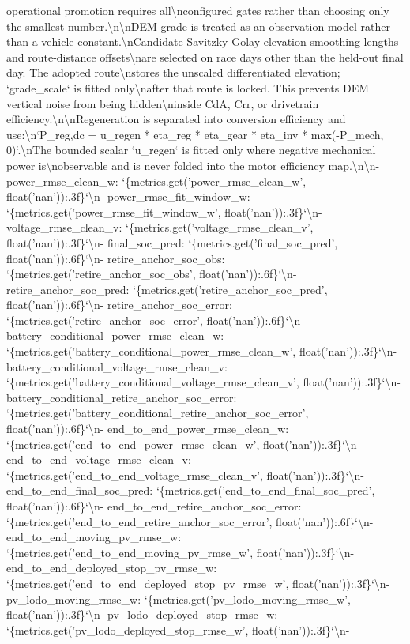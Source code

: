 \documentclass[a4paper,11pt]{article}
\begin{document}
\begin{enumerate}[leftmargin=1.8em]
operational promotion requires all\textbackslash{}nconfigured gates rather than choosing only the smallest number.\textbackslash{}n\textbackslash{}nDEM grade is treated as an observation model rather than a vehicle constant.\textbackslash{}nCandidate Savitzky-Golay elevation smoothing lengths and route-distance offsets\textbackslash{}nare selected on race days other than the held-out final day. The adopted route\textbackslash{}nstores the unscaled differentiated elevation; `grade\_scale` is fitted only\textbackslash{}nafter that route is locked. This prevents DEM vertical noise from being hidden\textbackslash{}ninside CdA, Crr, or drivetrain efficiency.\textbackslash{}n\textbackslash{}nRegeneration is separated into conversion efficiency and use:\textbackslash{}n`P\_reg,dc = u\_regen * eta\_reg * eta\_gear * eta\_inv * max(-P\_mech, 0)`.\textbackslash{}nThe bounded scalar `u\_regen` is fitted only where negative mechanical power is\textbackslash{}nobservable and is never folded into the motor efficiency map.\textbackslash{}n\textbackslash{}n- power\_rmse\_clean\_w: `\{metrics.get('power\_rmse\_clean\_w', float('nan')):.3f\}`\textbackslash{}n- power\_rmse\_fit\_window\_w: `\{metrics.get('power\_rmse\_fit\_window\_w', float('nan')):.3f\}`\textbackslash{}n- voltage\_rmse\_clean\_v: `\{metrics.get('voltage\_rmse\_clean\_v', float('nan')):.3f\}`\textbackslash{}n- final\_soc\_pred: `\{metrics.get('final\_soc\_pred', float('nan')):.6f\}`\textbackslash{}n- retire\_anchor\_soc\_obs: `\{metrics.get('retire\_anchor\_soc\_obs', float('nan')):.6f\}`\textbackslash{}n- retire\_anchor\_soc\_pred: `\{metrics.get('retire\_anchor\_soc\_pred', float('nan')):.6f\}`\textbackslash{}n- retire\_anchor\_soc\_error: `\{metrics.get('retire\_anchor\_soc\_error', float('nan')):.6f\}`\textbackslash{}n- battery\_conditional\_power\_rmse\_clean\_w: `\{metrics.get('battery\_conditional\_power\_rmse\_clean\_w', float('nan')):.3f\}`\textbackslash{}n- battery\_conditional\_voltage\_rmse\_clean\_v: `\{metrics.get('battery\_conditional\_voltage\_rmse\_clean\_v', float('nan')):.3f\}`\textbackslash{}n- battery\_conditional\_retire\_anchor\_soc\_error: `\{metrics.get('battery\_conditional\_retire\_anchor\_soc\_error', float('nan')):.6f\}`\textbackslash{}n- end\_to\_end\_power\_rmse\_clean\_w: `\{metrics.get('end\_to\_end\_power\_rmse\_clean\_w', float('nan')):.3f\}`\textbackslash{}n- end\_to\_end\_voltage\_rmse\_clean\_v: `\{metrics.get('end\_to\_end\_voltage\_rmse\_clean\_v', float('nan')):.3f\}`\textbackslash{}n- end\_to\_end\_final\_soc\_pred: `\{metrics.get('end\_to\_end\_final\_soc\_pred', float('nan')):.6f\}`\textbackslash{}n- end\_to\_end\_retire\_anchor\_soc\_error: `\{metrics.get('end\_to\_end\_retire\_anchor\_soc\_error', float('nan')):.6f\}`\textbackslash{}n- end\_to\_end\_moving\_pv\_rmse\_w: `\{metrics.get('end\_to\_end\_moving\_pv\_rmse\_w', float('nan')):.3f\}`\textbackslash{}n- end\_to\_end\_deployed\_stop\_pv\_rmse\_w: `\{metrics.get('end\_to\_end\_deployed\_stop\_pv\_rmse\_w', float('nan')):.3f\}`\textbackslash{}n- pv\_lodo\_moving\_rmse\_w: `\{metrics.get('pv\_lodo\_moving\_rmse\_w', float('nan')):.3f\}`\textbackslash{}n- pv\_lodo\_deployed\_stop\_rmse\_w: `\{metrics.get('pv\_lodo\_deployed\_stop\_rmse\_w', float('nan')):.3f\}`\textbackslash{}n- 
\end{enumerate}
\end{document}
